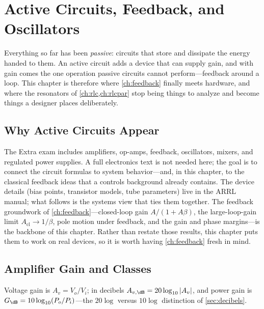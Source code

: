 \chapter{Active Circuits, Feedback, and Oscillators}
\label{ch:active}
Everything so far has been \emph{passive}: circuits that store and dissipate the
energy handed to them. An active circuit adds a device that can supply gain, and with
gain comes the one operation passive circuits cannot perform---feedback around a
loop. This chapter is therefore where \cref{ch:feedback} finally meets hardware, and
where the resonators of \cref{ch:rlc,ch:rlcpar} stop being things to analyze and
become things a designer places deliberately.

\section{Why Active Circuits Appear}
The Extra exam includes amplifiers, op-amps, feedback, oscillators, mixers, and
regulated power supplies. A full electronics text is not needed here; the goal is
to connect the circuit formulas to system behavior---and, in this chapter, to the
classical feedback ideas that a controls background already contains. The device
details (bias points, transistor models, tube parameters) live in the ARRL
manual; what follows is the systems view that ties them together. The feedback
groundwork of \cref{ch:feedback}---closed-loop gain \(A/(1+A\beta)\), the
large-loop-gain limit \(A_{\text{cl}}\to1/\beta\), pole motion under feedback, and
the gain and phase margins---is the backbone of this chapter. Rather than restate
those results, this chapter puts them to work on real devices, so it is worth having
\cref{ch:feedback} fresh in mind.

\section{Amplifier Gain and Classes}
\label{sec:classes}
Voltage gain is \(A_v=V_o/V_i\); in decibels \(A_{v,\dB}=20\log_{10}|A_v|\), and power
gain is \(G_{\dB}=10\log_{10}(P_o/P_i)\)---the \(20\log\) versus \(10\log\)
distinction of \cref{sec:decibels}.

